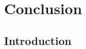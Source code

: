 \chapter{Conclusion}\label{ch:Conclusion}

\section{Introduction}\label{sec:IntroDuction} 











